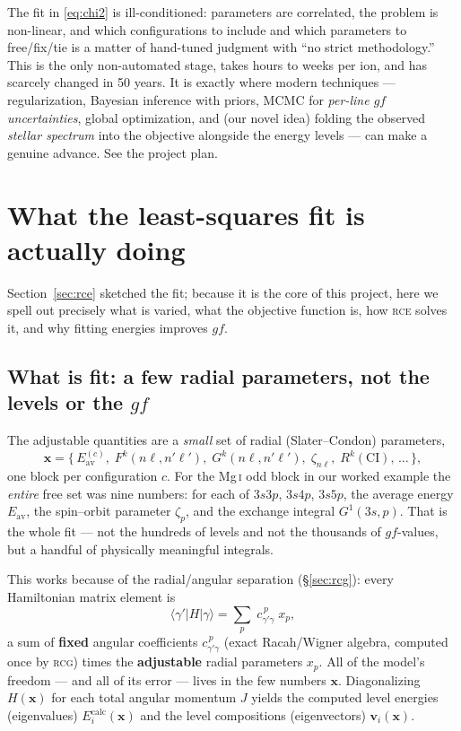 \documentclass[11pt]{article}
\newcommand{\Fk}{F^{k}}
\newcommand{\Gk}{G^{k}}
\newcommand{\Rk}{R^{k}}
\newcommand{\znl}{\zeta_{n\ell}}
\newcommand{\Eav}{E_{\mathrm{av}}}
\newcommand{\prog}[1]{\textsc{#1}}
\begin{document}
The fit in \eqref{eq:chi2} is ill-conditioned: parameters are correlated, the
problem is non-linear, and which configurations to include and which parameters
to free/fix/tie is a matter of hand-tuned judgment with ``no strict
methodology.'' This is the only non-automated stage, takes hours to weeks per
ion, and has scarcely changed in 50 years. It is exactly where modern techniques
--- regularization, Bayesian inference with priors, MCMC for \emph{per-line $gf$
uncertainties}, global optimization, and (our novel idea) folding the observed
\emph{stellar spectrum} into the objective alongside the energy levels --- can
make a genuine advance. See the project plan.

\section{What the least-squares fit is actually doing}
\label{sec:fitdetail}

Section~\ref{sec:rce} sketched the fit; because it is the core of this project,
here we spell out precisely what is varied, what the objective function is, how
\prog{rce} solves it, and why fitting energies improves $gf$.

\subsection{What is fit: a few radial parameters, not the levels or the $gf$}

The adjustable quantities are a \emph{small} set of radial (Slater--Condon)
parameters,
\[
  \mathbf{x} = \{\,\Eav^{(c)},\; \Fk(n\ell,n'\ell'),\; \Gk(n\ell,n'\ell'),\;
  \znl,\; \Rk(\text{CI}),\,\dots\,\},
\]
one block per configuration $c$. For the Mg\,\textsc{i} odd block in our worked
example the \emph{entire} free set was nine numbers: for each of $3s3p$, $3s4p$,
$3s5p$, the average energy $\Eav$, the spin--orbit parameter $\zeta_{p}$, and the
exchange integral $G^{1}(3s,p)$. That is the whole fit --- not the hundreds of
levels and not the thousands of $gf$-values, but a handful of physically
meaningful integrals.

This works because of the radial/angular separation (\S\ref{sec:rcg}): every
Hamiltonian matrix element is
\[
  \langle \gamma' | H | \gamma\rangle
  = \sum_{p} \; c^{\,p}_{\gamma'\gamma}\; x_p ,
\]
a sum of \textbf{fixed} angular coefficients $c^{\,p}_{\gamma'\gamma}$ (exact
Racah/Wigner algebra, computed once by \prog{rcg}) times the \textbf{adjustable}
radial parameters $x_p$. All of the model's freedom --- and all of its error ---
lives in the few numbers $\mathbf{x}$. Diagonalizing $H(\mathbf{x})$ for each
total angular momentum $J$ yields the computed level energies (eigenvalues)
$E_i^{\mathrm{calc}}(\mathbf{x})$ and the level compositions (eigenvectors)
$\mathbf{v}_i(\mathbf{x})$.
\end{document}
